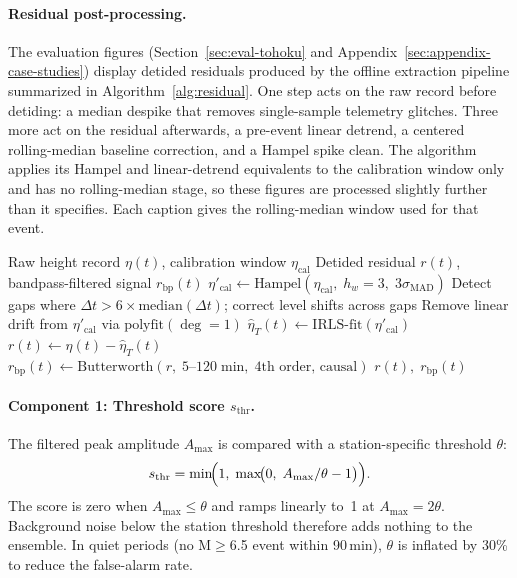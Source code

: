 \documentclass{article}
\begin{document}
\paragraph{Residual post-processing.}
The evaluation figures (Section~\ref{sec:eval-tohoku} and Appendix~\ref{sec:appendix-case-studies})
display detided residuals produced by the offline extraction pipeline
summarized in Algorithm~\ref{alg:residual}.  One step acts on the raw
record before detiding: a median despike that removes single-sample
telemetry glitches.  Three more act on the residual afterwards, a
pre-event linear detrend, a centered rolling-median baseline
correction, and a Hampel spike clean.  The algorithm applies its
Hampel and linear-detrend equivalents to the calibration window only
and has no rolling-median stage, so these figures are processed
slightly further than it specifies.  Each caption gives the
rolling-median window used for that event.

\begin{algorithm}[t]
\caption{Detided Residual Extraction}
\label{alg:residual}
\begin{algorithmic}[1]
\REQUIRE Raw height record $\eta(t)$, calibration window $\eta_\text{cal}$
\ENSURE Detided residual $r(t)$, bandpass-filtered signal $r_\text{bp}(t)$
\STATE {}
\STATE $\eta'_\text{cal} \leftarrow \text{Hampel}(\eta_\text{cal},\;
  h_w{=}3,\; 3\sigma_\text{MAD})$
\STATE Detect gaps where $\Delta t > 6 \times \text{median}(\Delta t)$;
  correct level shifts across gaps
\STATE Remove linear drift from $\eta'_\text{cal}$ via $\text{polyfit}(\deg{=}1)$
\STATE {}
\STATE $\hat{\eta}_T(t) \leftarrow \text{IRLS-fit}(\eta'_\text{cal})$
\STATE {}
\STATE $r(t) \leftarrow \eta(t) - \hat{\eta}_T(t)$
\STATE $r_\text{bp}(t) \leftarrow \text{Butterworth}(r,\; 5\text{--}120\;\text{min},\;
  \text{4th order, causal})$
\RETURN $r(t),\; r_\text{bp}(t)$
\end{algorithmic}
\end{algorithm}

\paragraph{Component 1: Threshold score $s_\text{thr}$.}
The filtered peak amplitude $A_\text{max}$ is compared with a
station-specific threshold $\theta$:
\begin{equation}
  s_\text{thr} = \min\!\Bigl(1,\;
    \max\!\bigl(0,\; A_\text{max}/\theta - 1\bigr)\Bigr).
\end{equation}
The score is zero when $A_\text{max} \leq \theta$ and ramps linearly
to~1 at $A_\text{max} = 2\theta$. Background noise below the station threshold therefore adds
nothing to the ensemble. In quiet periods (no M$\geq$6.5 event within 90\,min),
$\theta$ is inflated by 30\% to reduce the false-alarm rate.
\end{document}
